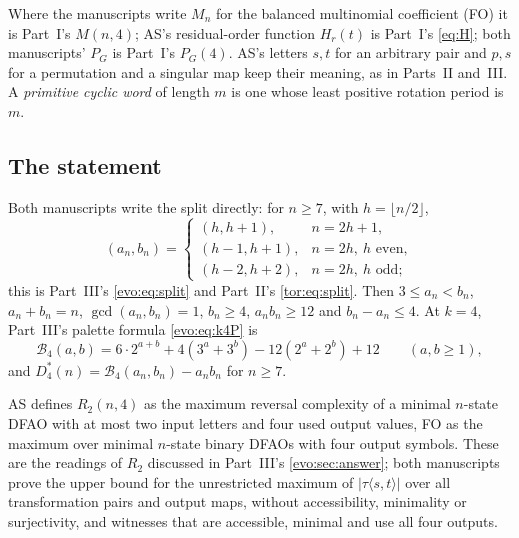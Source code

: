 \documentclass[11pt,a4paper]{article}
\numberwithin{equation}{section}
\theoremstyle{definition}
\theoremstyle{remark}
\newcommand{\Bip}{\mathcal B}
\begin{document}
Where the manuscripts write $M_n$ for the balanced multinomial coefficient
(FO) it is Part~I's $M(n,4)$; AS's residual-order function $H_r(t)$ is Part~I's
\eqref{eq:H}; both manuscripts' $P_G$ is Part~I's $P_G(4)$. AS's letters $s,t$
for an arbitrary pair and $p,s$ for a permutation and a singular map keep
their meaning, as in Parts~II and~III. A \emph{primitive cyclic word} of length
$m$ is one whose least positive rotation period is $m$.

\subsection{The statement}\label{fo:sec:answer}

Both manuscripts write the split directly: for $n\ge7$, with
$h=\lfloor n/2\rfloor$,
\begin{equation}\label{fo:eq:split}
 (a_n,b_n)=
 \begin{cases}
 (h,h+1),&n=2h+1,\\
 (h-1,h+1),&n=2h,\ h\text{ even},\\
 (h-2,h+2),&n=2h,\ h\text{ odd};
 \end{cases}
\end{equation}
this is Part~III's \eqref{evo:eq:split} and Part~II's \eqref{tor:eq:split}.
Then $3\le a_n<b_n$, $a_n+b_n=n$, $\gcd(a_n,b_n)=1$, $b_n\ge4$,
$a_nb_n\ge12$ and $b_n-a_n\le4$. At $k=4$, Part~III's palette formula
\eqref{evo:eq:k4P} is
\begin{equation}\label{fo:eq:B4}
 \Bip_4(a,b)=6\cdot2^{a+b}+4(3^a+3^b)-12(2^a+2^b)+12\qquad(a,b\ge1),
\end{equation}
and $D^*_4(n)=\Bip_4(a_n,b_n)-a_nb_n$ for $n\ge7$.

AS defines $R_2(n,4)$ as the maximum reversal complexity of a minimal
$n$-state DFAO with at most two input letters and four used output values,
FO as the maximum over minimal $n$-state binary DFAOs with four output
symbols. These are the readings of $R_2$ discussed in Part~III's
\cref{evo:sec:answer}; both manuscripts prove the upper bound for the
unrestricted maximum of $|\tau\langle s,t\rangle|$ over all transformation
pairs and output maps, without accessibility, minimality or surjectivity, and
witnesses that are accessible, minimal and use all four outputs.
\end{document}
